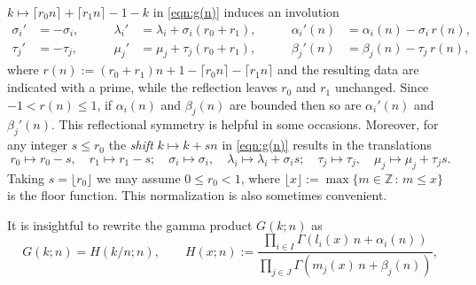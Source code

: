 \documentclass[a4paper,12pt]{article}
\theoremstyle{plain}
\def\Z{\mathbb{Z}}
\def\vG{\varGamma}
\begin{document}
$k \mapsto \lceil r_0 n \rceil + \lceil r_1 n \rceil -1 -k$ in \eqref{eqn:g(n)} induces an involution 
\begin{subequations} \label{eqn:refl}
\begin{alignat}{3}
\sigma_i' &= - \sigma_i, \qquad  & \lambda_i' &= \lambda_i + \sigma_i (r_0 + r_1),  \qquad & 
\alpha_i'(n) &= \alpha_i(n) - \sigma_i \, r(n),  \label{eqn:refl-s} \\
   \tau_j' &= - \tau_j,     \qquad  & \mu_j'      &= \mu_j + \tau_j (r_0 + r_1), \qquad & 
\beta_j'(n) &= \beta_j(n)  - \tau_j \, r(n),   \label{eqn:refl-t}
\end{alignat}
\end{subequations}
where $r(n) := (r_0+r_1) n +1 - \lceil r_0 n \rceil - \lceil r_1 n \rceil $ and the resulting     
data are indicated with a prime, while the reflection leaves $r_0$ and $r_1$ unchanged.  
Since $-1 < r(n) \le 1$, if $\alpha_i(n)$ and $\beta_j(n)$ are bounded then so are 
$\alpha_i'(n)$ and $\beta_j'(n)$.  
This reflectional symmetry is helpful in some occasions. 
Moreover, for any integer $s \le r_0$ the {\sl shift} $k \mapsto k + s n$ in 
\eqref{eqn:g(n)} results in the translations   
\begin{equation} \label{eqn:shift}
r_0 \mapsto r_0 - s, \quad r_1 \mapsto r_1 - s; \quad 
\sigma_i \mapsto \sigma_i, \quad \lambda_i \mapsto  \lambda_i + \sigma_i s; \quad 
\tau_j \mapsto \tau_j, \quad \mu_j \mapsto \mu_j + \tau_j s.     
\end{equation}    
Taking $s = \lfloor r_0 \rfloor$ we may assume $0 \le r_0 < 1$, where 
$\lfloor x \rfloor := \max \{ m \in \Z \,:\, m \le x \}$ is the floor function.    
This normalization is also sometimes convenient.      
\par
It is insightful to rewrite the gamma product $G(k; n)$ as    
\begin{equation} \label{eqn:H}
G(k; n) = H\left( k/n ; n \right), 
\qquad 
H(x; n) := \dfrac{\prod_{i \in I} \vG( l_i(x) \, n + \alpha_i(n))}{\prod_{j \in J} 
\vG( m_j(x) \, n + \beta_j(n))},   
\end{equation}
\end{document}
